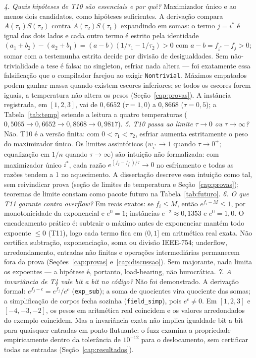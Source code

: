 \textit{4. Quais hipóteses de T10 são essenciais e por quê?} Maximizador único e ao menos dois candidatos, como hipóteses suficientes. A derivação compara $A(\tau_1)S(\tau_2)$ contra $A(\tau_2)S(\tau_1)$ expandindo em somas: o termo $j=i^*$ é igual dos dois lados e cada outro termo é estrito pela identidade $(a_1+b_2)-(a_2+b_1)=(a-b)(1/\tau_1-1/\tau_2)>0$ com $a-b=f_{i^*}-f_j>0$; somar com a testemunha estrita decide por divisão de desigualdades. Sem não-trivialidade a tese é falsa: no singleton, esfriar nada altera --- foi exatamente essa falsificação que o compilador farejou ao exigir \texttt{Nontrivial}. Máximos empatados podem ganhar massa quando existem escores inferiores; se todos os escores forem iguais, a temperatura não altera os pesos (Seção~\ref{cap:provas}). A instância registrada, em $[1,2,3]$, vai de $0{,}6652$ ($\tau=1{,}0$) a $0{,}8668$ ($\tau=0{,}5$); a Tabela~\ref{tab:temp} estende a leitura a quatro temperaturas ($0{,}5065\to0{,}6652\to0{,}8668\to0{,}9817$).
\textit{5. T10 passa ao limite $\tau\to0$ ou $\tau\to\infty$?} Não. T10 é a versão finita: com $0<\tau_1<\tau_2$, esfriar aumenta estritamente o peso do maximizador único. Os limites assintóticos ($w_{i^*}\to1$ quando $\tau\to0^+$; equalização em $1/n$ quando $\tau\to\infty$) são intuição não formalizada: com maximizador único $i^*$, cada razão $e^{(f_j-f_{i^*})/\tau}\to0$ no esfriamento e todas as razões tendem a 1 no aquecimento. A dissertação descreve essa intuição como tal, sem reivindicar prova (seção de limites de temperatura e Seção~\ref{cap:provas}); teoremas de limite constam como pacote futuro na Tabela~\ref{tab:futuro}.
\textit{6. O que T11 garante contra overflow?} Em reais exatos: se $f_i\leq M$, então $e^{f_i-M}\leq1$, por monotonicidade da exponencial e $e^0=1$; instâncias $e^{-2}\approx0{,}1353$ e $e^{0}=1{,}0$. O encadeamento prático é: subtrair o máximo antes de exponenciar mantém todo expoente $\leq0$ (T11), logo cada termo fica em $(0,1]$ em aritmética real exata. Não certifica subtração, exponenciação, soma ou divisão IEEE-754; underflow, arredondamento, entradas não finitas e operações intermediárias permanecem fora da prova (Seções~\ref{cap:provas} e~\ref{cap:discussao}). Sem majorante, nada limita os expoentes --- a hipótese é, portanto, load-bearing, não burocrática.
\textit{7. A invariância de T4 vale bit a bit no código?} Não foi demonstrado. A derivação formal: $e^{f_j-c}=e^{f_j}/e^c$ (\texttt{exp\_sub}); a soma de quocientes vira quociente das somas; a simplificação de corpos fecha sozinha (\texttt{field\_simp}), pois $e^c\neq0$. Em $[1,2,3]$ e $[-4,-3,-2]$, os pesos em aritmética real coincidem e os valores arredondados do exemplo coincidem. Mas a invariância exata não implica igualdade bit a bit para quaisquer entradas em ponto flutuante: o fuzz examina a propriedade empiricamente dentro da tolerância de $10^{-12}$ para o deslocamento, sem certificar todas as entradas (Seção~\ref{cap:resultados}).
